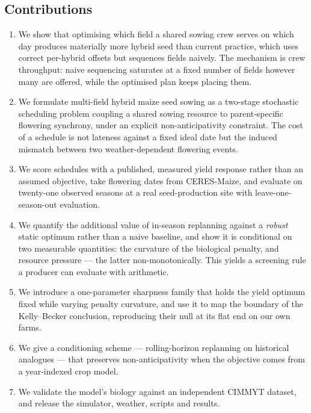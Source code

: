 \documentclass[10pt,twocolumn]{article}
\begin{document}
\subsection{Contributions}

\begin{enumerate}
\itemsep1pt
\item We show that optimising which field a shared sowing crew serves on
which day produces materially more hybrid seed than current practice, which
uses correct per-hybrid offsets but sequences fields naively. The mechanism
is crew throughput: naive sequencing saturates at a fixed number of fields
however many are offered, while the optimised plan keeps placing them.
\item We formulate multi-field hybrid maize seed sowing as a two-stage
stochastic scheduling problem coupling a shared sowing resource to
parent-specific flowering synchrony, under an explicit non-anticipativity
constraint. The cost of a schedule is not lateness against a fixed ideal date
but the induced mismatch between two weather-dependent flowering events.
\item We score schedules with a published, measured yield response rather
than an assumed objective, take flowering dates from CERES-Maize, and
evaluate on twenty-one observed seasons at a real seed-production site with
leave-one-season-out evaluation.
\item We quantify the additional value of in-season replanning against a
\emph{robust} static optimum rather than a naive baseline, and show it is
conditional on two measurable quantities: the curvature of the biological
penalty, and resource pressure --- the latter non-monotonically. This yields
a screening rule a producer can evaluate with arithmetic.
\item We introduce a one-parameter sharpness family that holds the yield
optimum fixed while varying penalty curvature, and use it to map the
boundary of the Kelly--Becker conclusion, reproducing their null at its flat
end on our own farms.
\item We give a conditioning scheme --- rolling-horizon replanning on
historical analogues --- that preserves non-anticipativity when the objective
comes from a year-indexed crop model.
\item We validate the model's biology against an independent CIMMYT dataset,
and release the simulator, weather, scripts and results.
\end{enumerate}

\end{document}
